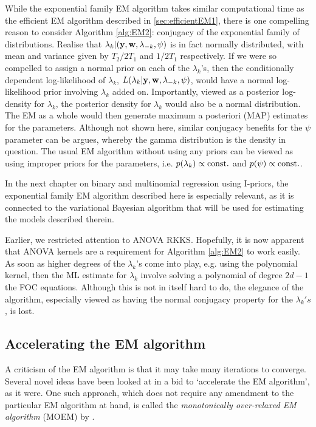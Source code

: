 While the exponential family EM algorithm takes similar computational time as the efficient EM algorithm described in \autoref{sec:efficientEM1}, there is one compelling reason to consider Algorithm \ref{alg:EM2}: conjugacy of the exponential family of distributions.
Realise that $\lambda_k|({\mathbf y},{\mathbf w},\lambda_{-k},\psi)$ is in fact normally distributed, with mean and variance given by $T_2/2T_1$ and $1/2T_1$ respectively.
If we were so compelled to assign a normal prior on each of the $\lambda_k$'s, then the conditionally dependent log-likelihood of $\lambda_k$, $L(\lambda_k|{\mathbf y},{\mathbf w},\lambda_{-k},\psi)$, would have a normal log-likelihood prior involving $\lambda_k$ added on.
Importantly, viewed as a posterior log-density for $\lambda_k$, the posterior density for $\lambda_k$ would also be a normal distribution.
The EM as a whole would then generate maximum a posteriori (MAP) estimates for the parameters.
Although not shown here, similar conjugacy benefits for the $\psi$ parameter can be argues, whereby the gamma distribution is the density in question.
The usual EM algorithm without using any priors can be viewed as using improper priors for the parameters, i.e. $p(\lambda_k) \propto \text{const.}\hspace{0.01em}$ and $p(\psi) \propto \text{const.}\hspace{0.01em}$.

In the next chapter on binary and multinomial regression using I-priors, the exponential family EM algorithm described here is especially relevant, as it is connected to the variational Bayesian algorithm \citep{bernardo2003variational} that will be used for estimating the models described therein.

\begin{remark}
  Earlier, we restricted attention to ANOVA RKKS. 
  Hopefully, it is now apparent that ANOVA kernels are a requirement for Algorithm \ref{alg:EM2} to work easily.
  As soon as higher degrees of the $\lambda_k$'s come into play, e.g. using the polynomial kernel, then the ML estimate for $\lambda_k$ involve solving a polynomial of degree $2d-1$ the FOC equations.
  Although this is not in itself hard to do, the elegance of the algorithm, especially viewed as having the normal conjugacy property for the $\lambda_k's$, is lost.
\end{remark}

\subsection{Accelerating the EM algorithm}

A criticism of the EM algorithm is that it may take many iterations to converge.
Several novel ideas have been looked at in a bid to `accelerate the EM algorithm', as it were.
One such approach, which does not require any amendment to the particular EM algorithm at hand, is called the \emph{monotonically over-relaxed EM algorithm} (MOEM) by \citet{yu2012monotonically}.

